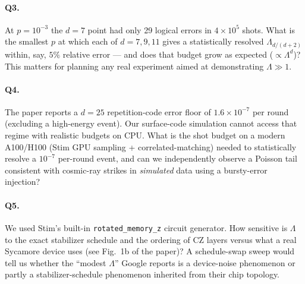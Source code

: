 \documentclass[11pt]{article}
\begin{document}
\paragraph{Q3.} At $p=10^{-3}$ the $d=7$ point had only 29 logical errors in
$4\!\times\!10^{5}$ shots. What is the smallest $p$ at which each of $d=7,9,11$
gives a statistically resolved $\Lambda_{d/(d+2)}$ within, say, $5\%$ relative
error --- and does that budget grow as expected ($\propto \Lambda^d$)? This
matters for planning any real experiment aimed at demonstrating $\Lambda\gg 1$.

\paragraph{Q4.} The paper reports a $d=25$ repetition-code error floor of
$1.6\!\times\!10^{-7}$ per round (excluding a high-energy event). Our
surface-code simulation cannot access that regime with realistic budgets on
CPU. What is the shot budget on a modern A100/H100 (Stim GPU sampling +
correlated-matching) needed to statistically resolve a $10^{-7}$ per-round
event, and can we independently observe a Poisson tail consistent with
cosmic-ray strikes in \emph{simulated} data using a bursty-error injection?

\paragraph{Q5.} We used Stim's built-in
\texttt{rotated\_memory\_z} circuit generator. How sensitive is $\Lambda$ to
the exact stabilizer schedule and the ordering of CZ layers versus what a
real Sycamore device uses (see Fig.~1b of the paper)? A schedule-swap
sweep would tell us whether the ``modest $\Lambda$'' Google reports is a
device-noise phenomenon or partly a stabilizer-schedule phenomenon
inherited from their chip topology.
\end{document}
